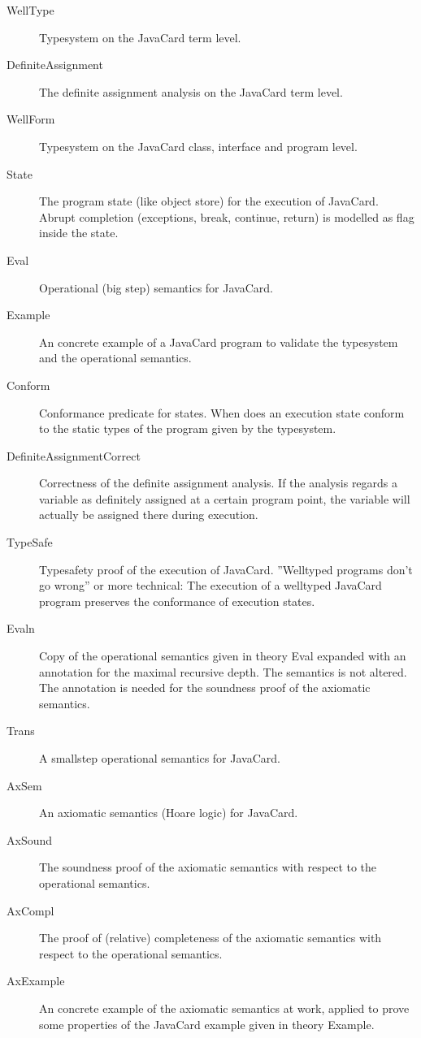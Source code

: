 \documentclass[11pt,a4paper]{book}
\begin{document}
\begin{description}
\item[WellType]
Typesystem on the JavaCard term level.

\item[DefiniteAssignment]
The definite assignment analysis on the JavaCard term level.

\item[WellForm]
Typesystem on the JavaCard class, interface and program level.

\item[State]
The program state (like object store) for the execution of JavaCard.
Abrupt completion (exceptions, break, continue, return) is modelled as flag
inside the state.

\item[Eval]
Operational (big step) semantics for JavaCard.

\item[Example]
An concrete example of a JavaCard program to validate the typesystem and the
operational semantics.

\item[Conform]
Conformance predicate for states. When does an execution state conform to the
static types of the program given by the typesystem.

\item[DefiniteAssignmentCorrect]
Correctness of the definite assignment analysis. If the analysis regards a variable as definitely assigned at a
certain program point, the variable will actually be assigned there during execution.

\item[TypeSafe]
Typesafety proof of the execution of JavaCard. ''Welltyped programs don't go
wrong'' or more technical: The execution of a welltyped JavaCard program 
preserves the conformance of execution states.

\item[Evaln]
Copy of the operational semantics given in theory Eval expanded with an annotation
for the maximal recursive depth. The semantics is not altered. The annotation
is needed for the soundness proof of the axiomatic semantics.

\item[Trans]
A smallstep operational semantics for JavaCard.

\item[AxSem]
An axiomatic semantics (Hoare logic) for JavaCard.

\item[AxSound]
The soundness proof of the axiomatic semantics with respect to the operational
semantics.

\item[AxCompl]
The proof of (relative) completeness of the axiomatic semantics with respect
to the operational semantics. 

\item[AxExample]
An concrete example of the axiomatic semantics at work, applied to prove 
some properties of the JavaCard example given in theory Example.
\end{description}
\end{document}
